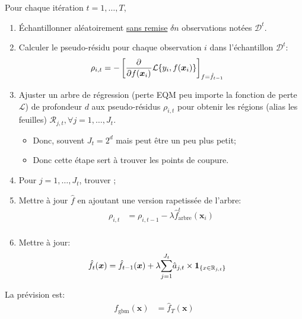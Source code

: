 \documentclass[10pt, french]{article}
\begin{document}
\begin{multicols*}{3}
\begin{algo2}
Pour chaque itération $t = 1, \dots, T$,
\begin{enumerate}[leftmargin  = *]
	\item	Échantillonner aléatoirement \underline{sans remise} $\delta n$ observations notées $\mathcal{D}^{t}$.
	\item	Calculer le pseudo-résidu pour chaque observation $i$ dans l'échantillon $\mathcal{D}^{t}$:
		\begin{align*}
		\rho_{i, t}
		&=	-\left[ 
				\frac{\partial^{}}{\partial f(\bm{x}_{i})^{}} \mathcal{L}\{y_{i}, f(\bm{x}_{i})\}
			\right]_{f = \hat{f}_{t - 1}}
		\end{align*}
	\item	Ajuster un arbre de régression (perte EQM peu importe la fonction de perte  $\mathcal{L}$) de profondeur $d$ aux pseudo-résidus $\rho_{i, t}$ pour obtenir les régions (alias les feuilles) $\mathcal{R}_{j, t}, \forall j = 1, \dots, J_{t}$.
		\begin{itemize}[leftmargin = *]
		\item	Donc, souvent $J_{t} = 2^{d}$ mais peut être un peu plus petit;
		\item	Donc cette étape sert à trouver les points de coupure.
		\end{itemize}
	\item	Pour $j = 1, \dots, J_{t}$, trouver ;
	\item	Mettre à jour $\hat{f}$ en ajoutant une version rapetissée de l'arbre:
		\begin{align*}
		\rho_{i, t}	&=	\rho_{i, t - 1} - \lambda \hat{f}^{t}_{\text{arbre}}(\bm{x}_{i})	\\
		\end{align*}
	\item	Mettre à jour:
		\begin{align*}
		\hat{f}_{t}(\bm{x})	
		&=	\hat{f}_{t - 1}(\bm{x}) + \lambda \overset{J_{t}}{\underset{j = 1}{\sum}} \hat{a}_{j, t} \times \bm{1}_{\{x \in \mathbb{R}_{j, t}\}}
		\end{align*}
\end{enumerate}

La prévision est:
\begin{align*}
	f_{\text{gbm}}(\bm{x})	
	&=	\hat{f}_{T}(\bm{x})
\end{align*}
\end{algo2}


\end{multicols*}
\end{document}
